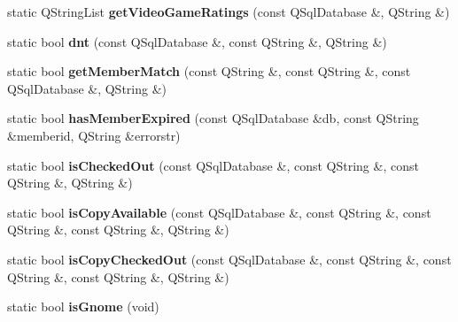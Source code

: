 \begin{DoxyCompactItemize}
\item 
static Q\+String\+List {\bfseries get\+Video\+Game\+Ratings} (const Q\+Sql\+Database \&, Q\+String \&)\hypertarget{classbiblioteq__misc__functions_aaa7ba3b910d0fd59f84ccd95daf2336d}{}\label{classbiblioteq__misc__functions_aaa7ba3b910d0fd59f84ccd95daf2336d}

\item 
static bool {\bfseries dnt} (const Q\+Sql\+Database \&, const Q\+String \&, Q\+String \&)\hypertarget{classbiblioteq__misc__functions_a255e10a89cd38d0291fc6fd52ec9162d}{}\label{classbiblioteq__misc__functions_a255e10a89cd38d0291fc6fd52ec9162d}

\item 
static bool {\bfseries get\+Member\+Match} (const Q\+String \&, const Q\+String \&, const Q\+Sql\+Database \&, Q\+String \&)\hypertarget{classbiblioteq__misc__functions_a42598c116f39f23c57181607d5f941e9}{}\label{classbiblioteq__misc__functions_a42598c116f39f23c57181607d5f941e9}

\item 
static bool {\bfseries has\+Member\+Expired} (const Q\+Sql\+Database \&db, const Q\+String \&memberid, Q\+String \&errorstr)\hypertarget{classbiblioteq__misc__functions_a6a898b598b851b5e8a46316fc8b3ff32}{}\label{classbiblioteq__misc__functions_a6a898b598b851b5e8a46316fc8b3ff32}

\item 
static bool {\bfseries is\+Checked\+Out} (const Q\+Sql\+Database \&, const Q\+String \&, const Q\+String \&, Q\+String \&)\hypertarget{classbiblioteq__misc__functions_a669aad938ac631a3d7f4f6def491caf6}{}\label{classbiblioteq__misc__functions_a669aad938ac631a3d7f4f6def491caf6}

\item 
static bool {\bfseries is\+Copy\+Available} (const Q\+Sql\+Database \&, const Q\+String \&, const Q\+String \&, const Q\+String \&, Q\+String \&)\hypertarget{classbiblioteq__misc__functions_afd3c75845edbf10af8606a67f0c5c1dc}{}\label{classbiblioteq__misc__functions_afd3c75845edbf10af8606a67f0c5c1dc}

\item 
static bool {\bfseries is\+Copy\+Checked\+Out} (const Q\+Sql\+Database \&, const Q\+String \&, const Q\+String \&, const Q\+String \&, Q\+String \&)\hypertarget{classbiblioteq__misc__functions_a7c84fddb5cd3b292289bb41c63c4440e}{}\label{classbiblioteq__misc__functions_a7c84fddb5cd3b292289bb41c63c4440e}

\item 
static bool {\bfseries is\+Gnome} (void)\hypertarget{classbiblioteq__misc__functions_a0b90606d0c828d910eef77c594605d9d}{}\label{classbiblioteq__misc__functions_a0b90606d0c828d910eef77c594605d9d}


\end{DoxyCompactItemize}
